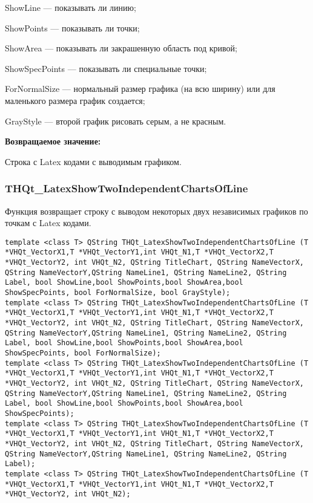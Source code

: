 \documentclass[a4paper,12pt]{article}
\begin{document}
ShowLine --- показывать ли линию;
 
ShowPoints --- показывать ли точки;
 
ShowArea --- показывать ли закрашенную область под кривой;
 
ShowSpecPoints --- показывать ли специальные точки;
 
ForNormalSize --- нормальный размер графика (на всю ширину) или для маленького размера график создается;
 
GrayStyle --- второй график рисовать серым, а не красным.
	
\textbf{Возвращаемое значение:}

Строка с Latex кодами с выводимым графиком.


\subsubsection{THQt\_LatexShowTwoIndependentChartsOfLine}\label{THQt_LatexShowTwoIndependentChartsOfLine}

Функция возвращает строку с выводом некоторых двух независимых графиков по точкам с Latex кодами.


\begin{lstlisting}[label=code_syntax_THQt_LatexShowTwoIndependentChartsOfLine,caption=Синтаксис]
template <class T> QString THQt_LatexShowTwoIndependentChartsOfLine (T *VHQt_VectorX1,T *VHQt_VectorY1,int VHQt_N1,T *VHQt_VectorX2,T *VHQt_VectorY2, int VHQt_N2, QString TitleChart, QString NameVectorX, QString NameVectorY,QString NameLine1, QString NameLine2, QString Label, bool ShowLine,bool ShowPoints,bool ShowArea,bool ShowSpecPoints, bool ForNormalSize, bool GrayStyle);
template <class T> QString THQt_LatexShowTwoIndependentChartsOfLine (T *VHQt_VectorX1,T *VHQt_VectorY1,int VHQt_N1,T *VHQt_VectorX2,T *VHQt_VectorY2, int VHQt_N2, QString TitleChart, QString NameVectorX, QString NameVectorY,QString NameLine1, QString NameLine2, QString Label, bool ShowLine,bool ShowPoints,bool ShowArea,bool ShowSpecPoints, bool ForNormalSize);
template <class T> QString THQt_LatexShowTwoIndependentChartsOfLine (T *VHQt_VectorX1,T *VHQt_VectorY1,int VHQt_N1,T *VHQt_VectorX2,T *VHQt_VectorY2, int VHQt_N2, QString TitleChart, QString NameVectorX, QString NameVectorY,QString NameLine1, QString NameLine2, QString Label, bool ShowLine,bool ShowPoints,bool ShowArea,bool ShowSpecPoints);
template <class T> QString THQt_LatexShowTwoIndependentChartsOfLine (T *VHQt_VectorX1,T *VHQt_VectorY1,int VHQt_N1,T *VHQt_VectorX2,T *VHQt_VectorY2, int VHQt_N2, QString TitleChart, QString NameVectorX, QString NameVectorY,QString NameLine1, QString NameLine2, QString Label);
template <class T> QString THQt_LatexShowTwoIndependentChartsOfLine (T *VHQt_VectorX1,T *VHQt_VectorY1,int VHQt_N1,T *VHQt_VectorX2,T *VHQt_VectorY2, int VHQt_N2);
\end{lstlisting}
\end{document}
